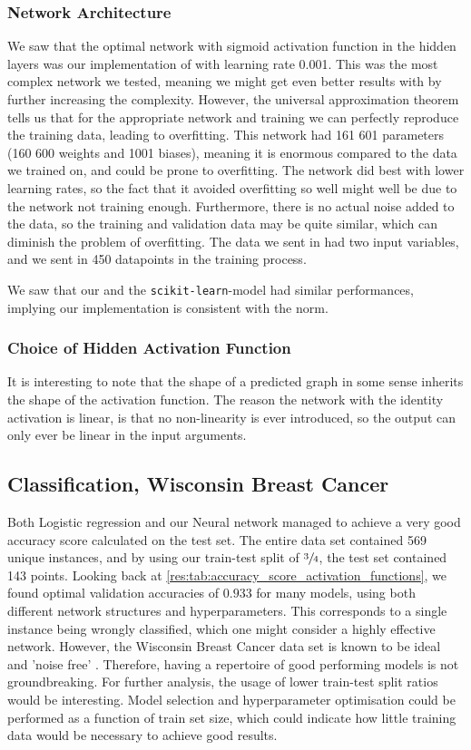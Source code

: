     \subsubsection{Network Architecture}
        We saw that the optimal network with sigmoid activation function in the hidden layers was our implementation of  with learning rate 0.001. This was the most complex network we tested, meaning we might get even better results with by further increasing the complexity. However, the universal approximation theorem tells us that for the appropriate network and training we can perfectly reproduce the training data, leading to overfitting. This network had 161 601 parameters (160 600 weights and 1001 biases), meaning it is enormous compared to the data we trained on, and could be prone to overfitting. The network did best with lower learning rates, so the fact that it avoided overfitting so well might well be due to the network not training enough. Furthermore, there is no actual noise added to the data, so the training and validation data may be quite similar, which can diminish the problem of overfitting. The data we sent in had two input variables, and we sent in 450 datapoints in the training process.
        
        We saw that our and the \verb|scikit-learn|-model had similar performances, implying our implementation is consistent with the norm.

    \subsubsection{Choice of Hidden Activation Function}
        It is interesting to note that the shape of a predicted graph in some sense inherits the shape of the activation function. The reason the network with the identity activation is linear, is that no non-linearity is ever introduced, so the output can only ever be linear in the input arguments.


\subsection{Classification, Wisconsin Breast Cancer}
    Both Logistic regression and our Neural network managed to achieve a very good accuracy score calculated on the test set. The entire data set contained 569 unique instances, and by using our train-test split of $\sfrac{3}{4}$, the test set contained 143 points. Looking back at \cref{res:tab:accuracy_score_activation_functions}, we found optimal validation accuracies of $0.933$ for many models, using both different network structures and hyperparameters. This corresponds to a single instance being wrongly classified, which one might consider a highly effective network. However, the Wisconsin Breast Cancer data set is known to be ideal and 'noise free' \citep{easyCancer}. Therefore, having a repertoire of good performing models is not groundbreaking. For further analysis, the usage of lower train-test split ratios would be interesting. Model selection and hyperparameter optimisation could be performed as a function of train set size, which could indicate how little training data would be necessary to achieve good results. 
    
